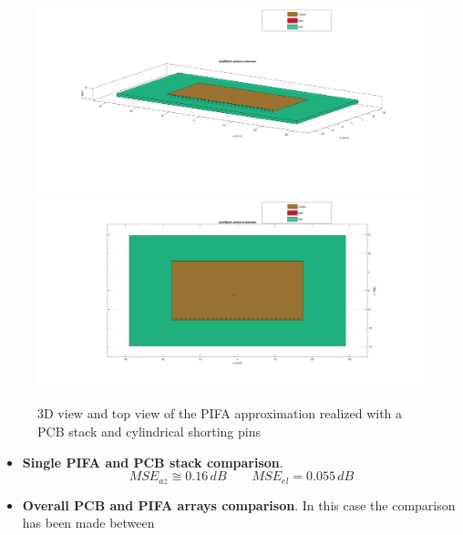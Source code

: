 \documentclass[12pt,a4paper]{article}
\begin{document}
{%
\begin{center}
	\begin{figure}[h]
		\includegraphics[scale=0.2]{pcb_shorting_pins_3d_view.pdf}
			\includegraphics[scale=0.2]{pcb_shorting_pins_top_view.pdf}
		\caption{3D view and top view of the PIFA approximation realized with a PCB stack and cylindrical shorting pins}
		\label{fig:pcb shorting}
	\end{figure}
\end{center}
\begin{itemize}
	\item \textbf{Single PIFA and PCB stack comparison}.
	\begin{equation}
		MSE_{az}\cong 0.16\,dB\qquad MSE_{el}=0.055\,dB
	\end{equation}
	\item \textbf{Overall PCB and PIFA arrays comparison}. In this case the comparison has been made between

\end{itemize}}
\end{document}
